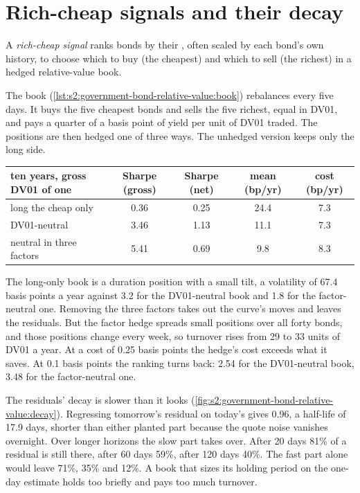 \section{Rich-cheap signals and their decay}

\begin{definition}\label{def:s2:government-bond-relative-value:signal}
A \emph{rich-cheap signal} ranks bonds by their , often scaled by each bond's own history, to choose
which to buy (the cheapest) and which to sell (the richest) in a hedged relative-value book.
\end{definition}

The book (\cref{lst:s2:government-bond-relative-value:book}) rebalances every five days. It buys the five cheapest bonds and sells the five richest,
equal in DV01, and pays a quarter of a basis point of yield per unit of DV01 traded. The positions are then hedged one of three ways. The unhedged
version keeps only the long side.

\begin{center}
\small
\begin{tabular}{@{}lcccc@{}}
\toprule
ten years, gross DV01 of one & Sharpe (gross) & Sharpe (net) & mean (bp/yr) & cost (bp/yr)\\
\midrule
long the cheap only & 0.36 & 0.25 & 24.4 & 7.3\\
DV01-neutral & 3.46 & 1.13 & 11.1 & 7.3\\
neutral in three factors & 5.41 & 0.69 & 9.8 & 8.3\\
\bottomrule
\end{tabular}
\end{center}

The long-only book is a duration position with a small tilt, a volatility of 67.4 basis points a year against 3.2 for the DV01-neutral book and 1.8 for
the factor-neutral one. Removing the three factors takes out the curve's moves and leaves the residuals. But the factor hedge spreads small positions
over all forty bonds, and those positions change every week, so turnover rises from 29 to 33 units of DV01 a year. At a cost of 0.25 basis points the
hedge's cost exceeds what it saves. At 0.1 basis points the ranking turns back: 2.54 for the DV01-neutral book, 3.48 for the factor-neutral one.

The residuals' decay is slower than it looks (\cref{fig:s2:government-bond-relative-value:decay}). Regressing tomorrow's residual on today's gives
0.96, a half-life of 17.9 days, shorter than either planted part because the quote noise vanishes overnight. Over longer horizons the slow part takes
over. After 20 days 81\% of a residual is still there, after 60 days 59\%, after 120 days 40\%. The fast part alone would leave 71\%, 35\% and 12\%.
A book that sizes its holding period on the one-day estimate holds too briefly and pays too much turnover.

